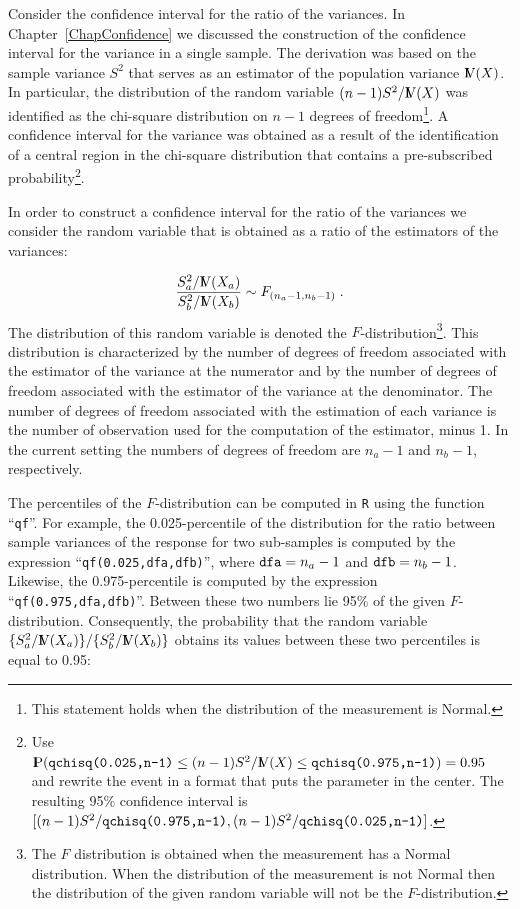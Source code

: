 \documentclass[]{krantz}
\newcommand{\Prob}{{\rm I\kern-.3em P}}
\newcommand{\Var}{{\rm I\kern-.3em V}}
\theoremstyle{definition}
\theoremstyle{definition}
\theoremstyle{definition}
\theoremstyle{remark}
\begin{document}
Consider the confidence interval for the ratio of the variances. In
Chapter~\ref{ChapConfidence} we discussed the construction of the
confidence interval for the variance in a single sample. The derivation
was based on the sample variance \(S^2\) that serves as an estimator of
the population variance \(\Var(X)\). In particular, the distribution of
the random variable \((n-1)S^2/\Var(X)\) was identified as the chi-square
distribution on \(n-1\) degrees of freedom\footnote{This statement holds when the distribution of the measurement is
  Normal.}. A confidence interval for
the variance was obtained as a result of the identification of a central
region in the chi-square distribution that contains a pre-subscribed
probability\footnote{Use
  \(\Prob(\mbox{\texttt{qchisq(0.025,n-1)}} \leq (n-1)S^2/\Var(X) \leq \mbox{\texttt{qchisq(0.975,n-1)}}) = 0.95\)
  and rewrite the event in a format that puts the parameter in the
  center. The resulting 95\% confidence interval is
  \([(n-1)S^2/\mbox{\texttt{qchisq(0.975,n-1)}},(n-1)S^2/\mbox{\texttt{qchisq(0.025,n-1)}}]\).}.

In order to construct a confidence interval for the ratio of the
variances we consider the random variable that is obtained as a ratio of
the estimators of the variances:

\[\frac{S_a^2/\Var(X_a)}{S^2_b/\Var(X_b)} \sim F_{(n_a-1,n_b-1)}\;.\]
The distribution of this random variable is denoted the
\(F\)-distribution\footnote{The \(F\) distribution is obtained when the measurement has a Normal
  distribution. When the distribution of the measurement is not Normal
  then the distribution of the given random variable will not be the
  \(F\)-distribution.}. This distribution is characterized by the number
of degrees of freedom associated with the estimator of the variance at
the numerator and by the number of degrees of freedom associated with
the estimator of the variance at the denominator. The number of degrees
of freedom associated with the estimation of each variance is the number
of observation used for the computation of the estimator, minus 1. In
the current setting the numbers of degrees of freedom are \(n_a-1\) and
\(n_b-1\), respectively.

The percentiles of the \(F\)-distribution can be computed in \texttt{R} using the
function ``\texttt{qf}''. For example, the 0.025-percentile of the distribution
for the ratio between sample variances of the response for two
sub-samples is computed by the expression ``\texttt{qf(0.025,dfa,dfb)}'', where
\(\mbox{\texttt{dfa}} = n_a - 1\) and \(\mbox{\texttt{dfb}} = n_b - 1\).
Likewise, the 0.975-percentile is computed by the expression
``\texttt{qf(0.975,dfa,dfb)}''. Between these two numbers lie 95\% of the given
\(F\)-distribution. Consequently, the probability that the random variable
\(\{S_a^2/\Var(X_a)\}/\{S_b^2/\Var(X_b)\}\) obtains its values between
these two percentiles is equal to 0.95:
\end{document}
